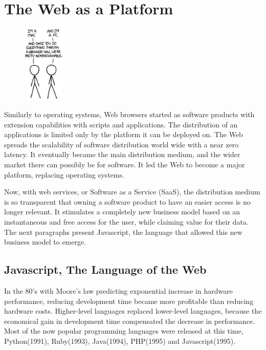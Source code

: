 \section{The Web as a Platform} \label{chapter2:web-as-a-platform}

\begin{figure}
  \vspace{-27pt}
  \begin{center}
    \includegraphics[width=0.18\textwidth]{../ressources/Mac-PC.png}
  \end{center}
  \vspace{-20pt}
\end{figure}

Similarly to operating systems, Web browsers started as software products with extension capabilities with scripts and applications.
The distribution of an applications is limited only by the platform it can be deployed on.
The Web spreads the scalability of software distribution world wide with a near zero latency.
It eventually became the main distribution medium, and the wider market there can possibly be for software.
It led the Web to become a major platform, replacing operating systems.

Now, with web services, or Software as a Service (SaaS), the distribution medium is so transparent that owning a software product to have an easier access is no longer relevant.
It stimulates a completely new business model based on an instantaneous and free access for the user, while claiming value for their data.
The next paragraphs present Javascript, the language that allowed this new business model to emerge.

\subsection{Javascript, The Language of the Web}

In the 80's with Moore's law predicting exponential increase in hardware performance, reducing development time became more profitable than reducing hardware costs.
Higher-level languages replaced lower-level languages, because the economical gain in development time compensated the decrease in performance.
Most of the now popular programming languages were released at this time, Python(1991), Ruby(1993), Java(1994), PHP(1995) and Javascript(1995).

